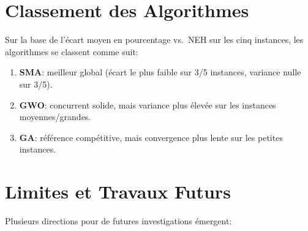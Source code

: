 \documentclass[12pt,a4paper,oneside]{report}
\begin{document}
\section{Classement des Algorithmes}

Sur la base de l'\'ecart moyen en pourcentage vs.\ NEH sur les cinq instances, les algorithmes se classent comme suit:

\begin{enumerate}[itemsep=4pt]
    \item \textbf{SMA}: meilleur global (\'ecart le plus faible sur 3/5 instances, variance nulle sur 3/5).
    \item \textbf{GWO}: concurrent solide, mais variance plus \'elev\'ee sur les instances moyennes/grandes.
    \item \textbf{GA}: r\'ef\'erence comp\'etitive, mais convergence plus lente sur les petites instances.
\end{enumerate}

\section{Limites et Travaux Futurs}

Plusieurs directions pour de futures investigations \'emergent:
\end{document}
